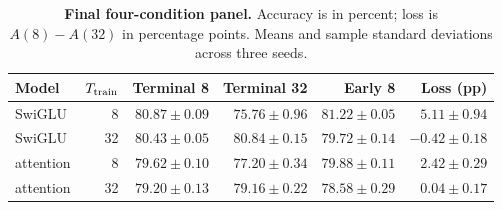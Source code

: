 \begin{table}[htbp]
\centering
\caption{\textbf{Final four-condition panel.} Accuracy is in percent; loss is $A(8)-A(32)$ in percentage points. Means and sample standard deviations across three seeds.}
\label{tab:modern_summary}
\small
\begin{tabular}{lrrrrr}
\toprule
Model & $T_{\rm train}$ & Terminal 8 & Terminal 32 & Early 8 & Loss (pp) \\
\midrule
SwiGLU & 8 & $80.87\pm0.09$ & $75.76\pm0.96$ & $81.22\pm0.05$ & $5.11\pm0.94$ \\
SwiGLU & 32 & $80.43\pm0.05$ & $80.84\pm0.15$ & $79.72\pm0.14$ & $-0.42\pm0.18$ \\
attention & 8 & $79.62\pm0.10$ & $77.20\pm0.34$ & $79.88\pm0.11$ & $2.42\pm0.29$ \\
attention & 32 & $79.20\pm0.13$ & $79.16\pm0.22$ & $78.58\pm0.29$ & $0.04\pm0.17$ \\
\bottomrule
\end{tabular}
\end{table}
